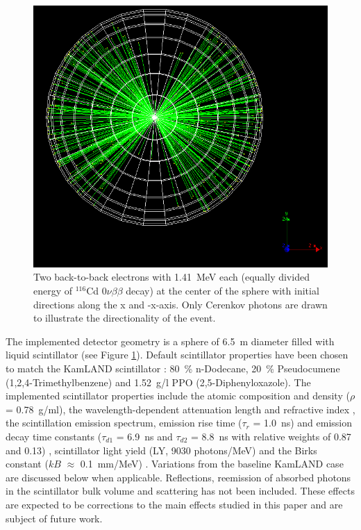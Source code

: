 \documentclass[aps,prc,twocolumn,groupedaddress,showpacs,amsmath,amssymb,floatfix,superscriptaddress]{revtex4}
\begin{document}
\begin{figure}
        \begin{center}
        \includegraphics[scale=0.25]{graphs/detector_view.png}
        \caption[]{Two back-to-back electrons with 1.41~MeV each (equally divided energy of $^116$Cd $0\nu\beta\beta$ decay) at the center of the sphere with initial directions along the x and -x-axis. Only Cerenkov photons are drawn to illustrate the directionality of the event. \label{detector_view}}
        \end{center}
\end{figure}

The implemented detector geometry is a sphere of 6.5~m diameter filled with liquid scintillator (see Figure \ref{detector_view}). Default scintillator properties have been chosen to match the KamLAND scintillator \cite{kamland2003}: 80~\% n-Dodecane, 20~\% Pseudocumene (1,2,4-Trimethylbenzene) and 1.52~g/l PPO (2,5-Diphenyloxazole). The implemented scintillator properties include the atomic composition and density ($\rho$ = 0.78~g/ml), the wavelength-dependent attenuation length \cite{tajimaMaster} and refractive index \cite{OlegThesis}, the scintillation emission spectrum, emission rise time ($\tau_r$ = 1.0~ns) and emission decay time constants ($\tau_{d1}$ = 6.9~ns and $\tau_{d2}$ = 8.8~ns with relative weights of 0.87 and 0.13) \cite{tajimaThesis}, scintillator light yield (LY, 9030 photons/MeV) and the Birks constant ($kB$ $\approx$ 0.1~mm/MeV) \cite{ChrisThesis}. Variations from the baseline KamLAND case are discussed below when applicable. Reflections, reemission of absorbed photons in the scintillator bulk volume and scattering has not been included. These effects are expected to be corrections to the main effects studied in this paper and are subject of future work. 
\end{document}
